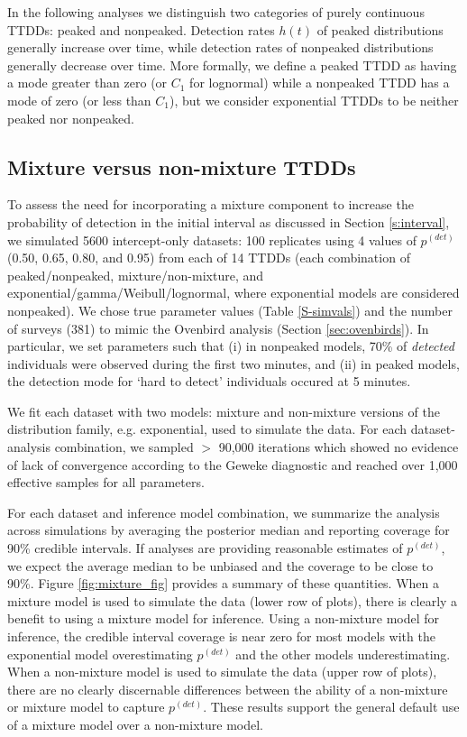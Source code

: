 \documentclass[12pt]{article}
\newcommand{\pdet}{p^{(det)}}
\begin{document}
In the following analyses we distinguish two categories of purely continuous TTDDs: peaked and nonpeaked.  
Detection rates $h(t)$ of peaked distributions generally increase over time, while detection rates of nonpeaked distributions generally decrease over time.
More formally, we define a peaked TTDD as having a mode greater than zero (or $C_1$ for lognormal) while a nonpeaked TTDD has a mode of zero (or less than $C_1$), but we consider exponential TTDDs to be neither peaked nor nonpeaked.









\subsection{Mixture versus non-mixture TTDDs}\label{sec:mixture}

To assess the need for incorporating a mixture component to increase the probability of detection in the initial interval as discussed in Section \ref{s:interval}, we simulated 5600 intercept-only datasets: 100 replicates using 4 values of $\pdet$ (0.50, 0.65, 0.80, and 0.95) from each of 14 TTDDs (each combination of peaked/nonpeaked, mixture/non-mixture, and exponential/gamma/Weibull/lognormal, where exponential models are considered nonpeaked).  
We chose true parameter values (Table \ref{S-simvals}) and the number of surveys (381) to mimic the Ovenbird analysis (Section \ref{sec:ovenbirds}).  
In particular, we set parameters such that (i) in nonpeaked models, 70\% of \textit{detected} individuals were observed during the first two minutes, and (ii) in peaked models, the detection mode for `hard to detect' individuals occured at 5 minutes.

We fit each dataset with two models: mixture and non-mixture versions of the distribution family, e.g. exponential, used to simulate the data.
For each dataset-analysis combination, we sampled $>$ 90,000 iterations which showed no evidence of lack of convergence according to the Geweke diagnostic and reached over 1,000 effective samples for all parameters. 

For each dataset and inference model combination, we summarize the analysis across simulations by averaging the posterior median and reporting coverage for 90\% credible intervals.
If analyses are providing reasonable estimates of $\pdet$, we expect the average median to be unbiased and the coverage to be close to 90\%.
Figure \ref{fig:mixture_fig} provides a summary of these quantities. 
When a mixture model is used to simulate the data (lower row of plots), there is clearly a benefit to using a mixture model for inference.  
Using a non-mixture model for inference, the credible interval coverage is near zero for most models with the exponential model overestimating $\pdet$ and the other models underestimating. 
When a non-mixture model is used to simulate the data (upper row of plots), there are no clearly discernable differences between the ability of a non-mixture or mixture model to capture $\pdet$. 
These results support the general default use of a mixture model over a non-mixture model.
\end{document}
